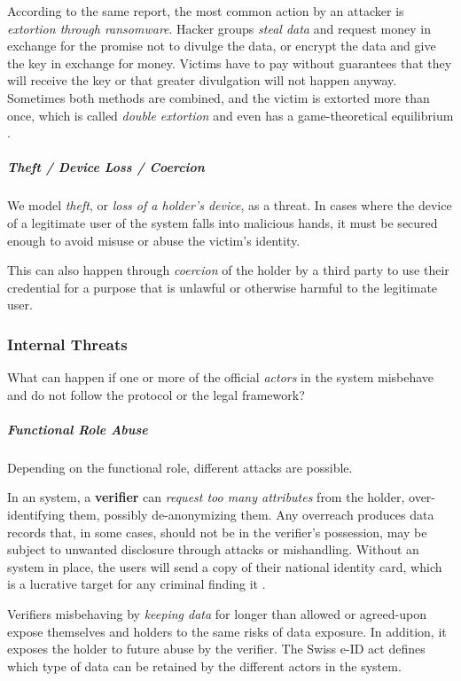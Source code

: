 According to the same report, the most common action by an attacker is \emph{extortion through ransomware}.
Hacker groups \emph{steal data} and request money in exchange for the promise not to divulge the data,
or encrypt the data and give the key in exchange for money.
Victims have to pay without guarantees that they will receive the key or that greater divulgation will not happen anyway.
Sometimes both methods are combined, and the victim is extorted more than once, which is called \emph{double extortion}
and even has a game-theoretical equilibrium \cite{Meurs24}.

\subparagraph{Theft / Device Loss / Coercion}

We model \emph{theft}, or \emph{loss of a holder's device}, as a threat.
In cases where the device of a legitimate user of the system falls into malicious hands, it must be secured enough to avoid misuse or abuse the victim's identity.

This can also happen through \emph{coercion} of the holder by a third party to use their
credential for a purpose that is unlawful or otherwise harmful to the legitimate user.

\subsubsection{Internal Threats}
\label{p:internal-threats}

What can happen if one or more of the official \emph{actors} in the \eid system
misbehave and do not follow the protocol or the legal framework?

\subparagraph{Functional Role Abuse}

Depending on the functional role, different attacks are possible. 

In an \eid system, a \textbf{verifier} can \emph{request too many attributes} 
from the holder, over-identifying them, possibly de-anonymizing them. 
Any overreach produces data records that, in some cases, should not be in the verifier’s possession, may be subject to unwanted disclosure through attacks or mishandling.
Without an \eid system in place, the users will send a copy of their national identity card, which is a lucrative target for any criminal finding it \cite{Tea25}.

Verifiers misbehaving by \emph{keeping data} for longer than allowed or agreed-upon expose themselves and holders to the same risks of data exposure. 
In addition, it exposes the holder to future abuse by the verifier.
The Swiss e-ID act defines which type of data can be retained by the different actors in the system.

